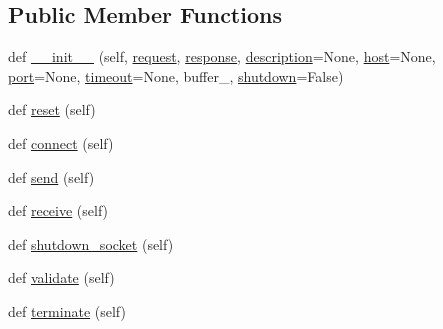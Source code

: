 \subsection*{Public Member Functions}
\begin{DoxyCompactItemize}
\item 
def \hyperlink{classpewpewlaz0rt4nk_1_1_beam_ab990f1d831d1f24fff891d8726d10300}{\+\_\+\+\_\+init\+\_\+\+\_\+} (self, \hyperlink{classpewpewlaz0rt4nk_1_1_beam_a51e6a0d2bcb8531a5e5adcd66a77aa3b}{request}, \hyperlink{classpewpewlaz0rt4nk_1_1_beam_a8ab7bcb35ce5bba05608c72da6b4a0d3}{response}, \hyperlink{classpewpewlaz0rt4nk_1_1_beam_a2661f439a4a94ffdcd5e47ae1da0bb1d}{description}=None, \hyperlink{classpewpewlaz0rt4nk_1_1_beam_a832ddc04754e8a43d4f3c6165b1294a7}{host}=None, \hyperlink{classpewpewlaz0rt4nk_1_1_beam_af8fb0f45ee0195c7422a49e6a8d72369}{port}=None, \hyperlink{classpewpewlaz0rt4nk_1_1_beam_aee145bfca8e9b2eaf3cd3c47157be9a3}{timeout}=None, buffer\+\_, \hyperlink{classpewpewlaz0rt4nk_1_1_beam_aa4a2d3facfe7f685ce8fdb8fdf68ac44}{shutdown}=False)
\item 
def \hyperlink{classpewpewlaz0rt4nk_1_1_beam_a51829b63adb24ac48d350dee60181002}{reset} (self)
\item 
def \hyperlink{classpewpewlaz0rt4nk_1_1_beam_a5505259a51131fe89dbde6fbeab32b52}{connect} (self)
\item 
def \hyperlink{classpewpewlaz0rt4nk_1_1_beam_a0fbdc6c4c08e0f205d671ea3cb6fffdd}{send} (self)
\item 
def \hyperlink{classpewpewlaz0rt4nk_1_1_beam_a06b2ff79fbf32e40f6f846b887ec7245}{receive} (self)
\item 
def \hyperlink{classpewpewlaz0rt4nk_1_1_beam_a00fe8c4d6cb42ed708b01611e4bc70dd}{shutdown\+\_\+socket} (self)
\item 
def \hyperlink{classpewpewlaz0rt4nk_1_1_beam_a7e676bc8e672824cf0719bff524d4067}{validate} (self)
\item 
def \hyperlink{classpewpewlaz0rt4nk_1_1_beam_a2561ec6ff5ec151676f3e0206e635bb8}{terminate} (self)
\end{DoxyCompactItemize}
